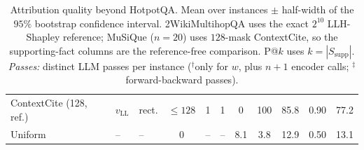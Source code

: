 \begin{table}[t]
{\begin{tabular}{lllcccccccc}
ContextCite (128, ref.) & $v_{\mathrm{LL}}$ & rect. & $\le 128$ & 1 & 1 & 0 & 100 & 85.8 & 0.90 & 77.2 \\
Uniform & -- & -- & 0 & -- & -- & 8.1 & 3.8 & 12.9 & 0.50 & 13.1 \\
\bottomrule
\end{tabular}%
}
\caption{Attribution quality beyond HotpotQA. Mean over instances $\pm$ half-width of the $95\%$ bootstrap confidence interval. 2WikiMultihopQA uses the exact $2^{10}$ LLH-Shapley reference; MuSiQue ($n = 20$) uses $128$-mask ContextCite, so the supporting-fact columns are the reference-free comparison. P@$k$ uses $k = |S_{\text{supp}}|$. \emph{Passes:} distinct LLM passes per instance ($^\dagger$only for $w$, plus $n+1$ encoder calls; $^\ddagger$forward-backward passes).}
\label{tab:exp_multi}
\end{table}

